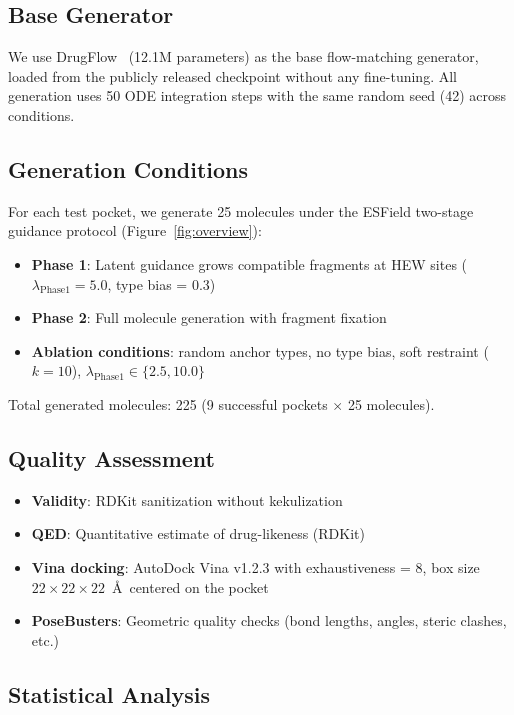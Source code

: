 \documentclass[journal=jcisd,manuscript=article]{achemso}
\begin{document}
\subsection{Base Generator}

We use DrugFlow~\cite{RN4} (12.1M parameters) as the base flow-matching
generator, loaded from the publicly released checkpoint without any
fine-tuning. All generation uses 50 ODE integration steps with the
same random seed (42) across conditions.

\subsection{Generation Conditions}

For each test pocket, we generate 25 molecules under the ESField
two-stage guidance protocol (Figure~\ref{fig:overview}):
\begin{itemize}
    \item \textbf{Phase 1}: Latent guidance grows compatible fragments
          at HEW sites ($\lambda_{\text{Phase1}} = 5.0$, type bias = 0.3)
    \item \textbf{Phase 2}: Full molecule generation with fragment fixation
    \item \textbf{Ablation conditions}: random anchor types, no type bias,
          soft restraint ($k=10$), $\lambda_{\text{Phase1}} \in \{2.5, 10.0\}$
\end{itemize}
Total generated molecules: 225 (9 successful pockets $\times$ 25 molecules).

\subsection{Quality Assessment}

\begin{itemize}
    \item \textbf{Validity}: RDKit sanitization without kekulization
    \item \textbf{QED}: Quantitative estimate of drug-likeness (RDKit)
    \item \textbf{Vina docking}: AutoDock Vina v1.2.3 with exhaustiveness = 8,
          box size $22 \times 22 \times 22$~\AA\ centered on the pocket
    \item \textbf{PoseBusters}: Geometric quality checks (bond lengths,
          angles, steric clashes, etc.)
\end{itemize}

\subsection{Statistical Analysis}
\end{document}

